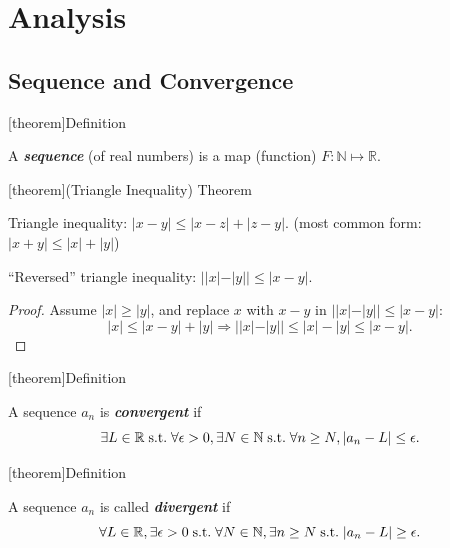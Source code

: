 \documentclass[12pt]{report}
\theoremstyle{definition}
\begin{document}



\chapter{Analysis}

\section{Sequence and Convergence}

[theorem]{Definition}
\begin{sequence}
    A \textbf{\emph{sequence}} (of real numbers) is a map (function) $F: \mathbb{N} \mapsto \mathbb{R}$.
\end{sequence}

[theorem]{(Triangle Inequality) Theorem}
\begin{triangle inequality}
    Triangle inequality: $|x-y| \le |x-z| + |z-y|$. (most common form: $|x+y| \le |x| + |y|$)

    ``Reversed'' triangle inequality: $||x|-|y|| \le |x-y|$.
\end{triangle inequality}

\begin{proof}
    Assume $|x| \ge |y|$, and replace $x$ with $x - y$ in $||x|-|y|| \le |x-y|$:\[
        |x| \le |x-y|+|y| \Rightarrow{}||x|-|y|| \le |x|-|y| \le |x-y|.
    \]
\end{proof}

[theorem]{Definition}
\begin{convergent sequences}
    A sequence $a_n$ is \textbf{\emph{convergent}} if \[
        \exists L \in \mathbb{R} \;\textnormal{s.t.}\; \forall \epsilon > 0,
        \exists N \in \mathbb{N} \;\textnormal{s.t.}\; \forall n \ge N, |a_n - L| \le \epsilon.
    \]
\end{convergent sequences}

[theorem]{Definition}
\begin{divergent sequences}
    A sequence $a_n$ is called \textbf{\emph{divergent}} if\[
        \forall L \in \mathbb{R}, \exists \epsilon > 0 \;\textnormal{s.t.}\;
        \forall N \in \mathbb{N}, \exists n \ge N \;\textnormal{s.t.}\; |a_n - L| \ge \epsilon.
    \]
\end{divergent sequences}
\end{document}
